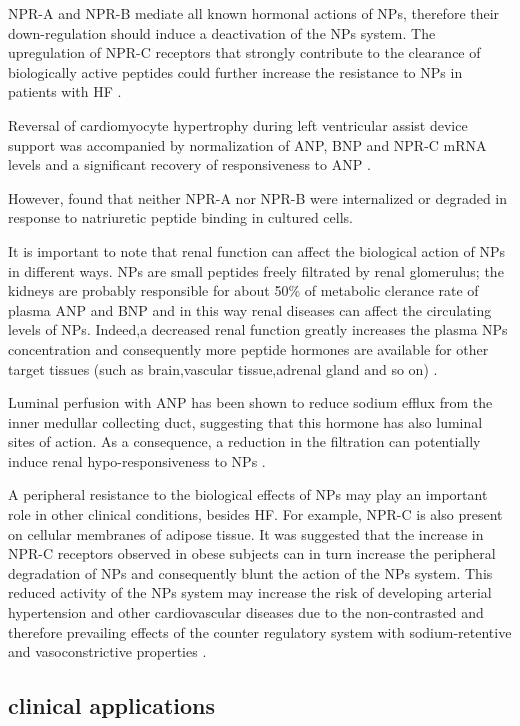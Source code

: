 \documentclass[14pt,a4paper,onecolumn]{extarticle}
\begin{document}
NPR-A and NPR-B mediate all known hormonal actions of NPs, therefore their down-regulation should induce a deactivation of the NPs system. The upregulation of NPR-C receptors that strongly contribute to the clearance of biologically active peptides could further increase the resistance to NPs in patients with HF \citep{bib343}. %

Reversal of cardiomyocyte hypertrophy during left ventricular assist device support was accompanied by normalization of ANP, BNP and NPR-C mRNA levels and a significant recovery of responsiveness to ANP \citep{bib347}. %

However,  \citep{bib348} found that neither NPR-A nor NPR-B were internalized or degraded in response to natriuretic peptide binding in cultured cells. %

It is important to note that renal function can affect the biological action of NPs in different ways.  NPs are small peptides freely filtrated by renal glomerulus; the kidneys are probably responsible for about 50\% of metabolic clerance rate of plasma ANP and BNP and in this way renal diseases can affect the circulating levels of NPs.  Indeed,a decreased renal function greatly increases the plasma NPs concentration and consequently more peptide hormones are available for other target tissues (such as brain,vascular tissue,adrenal gland and so on) \citep{bib35}. %

Luminal perfusion with ANP has been shown to reduce sodium efflux from the inner medullar collecting duct, suggesting that this hormone has also luminal sites of action.  As a consequence, a reduction in the filtration can potentially induce renal hypo-responsiveness to NPs \citep{bib325}. %

A peripheral resistance to the biological effects of NPs may play an important role in other clinical conditions, besides HF. For example, NPR-C is also present on cellular membranes of adipose tissue. It was suggested that the increase in NPR-C receptors observed in obese subjects can in turn increase the peripheral degradation of NPs and consequently blunt the action of the NPs system. This reduced activity of the NPs system may increase the risk of developing arterial hypertension and other cardiovascular diseases due to the non-contrasted and therefore prevailing effects of the counter regulatory system with sodium-retentive and vasoconstrictive properties \citep{bib352}. %

\subsection{clinical applications}
\end{document}
